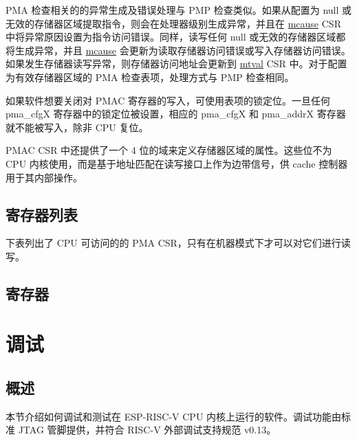 \documentclass[main\_\_CN.tex]{subfiles}
\begin{document}
PMA 检查相关的的异常生成及错误处理与 PMP 检查类似。如果从配置为 null 或无效的存储器区域提取指令，则会在处理器级别生成异常，并且在 \hyperref[regdesc:MCAUSE]{mcause} CSR 中将异常原因设置为指令访问错误。同样，读写任何 null 或无效的存储器区域都将生成异常，并且 \hyperref[regdesc:MCAUSE]{mcause} 会更新为读取存储器访问错误或写入存储器访问错误。如果发生存储器读写异常，则存储器访问地址会更新到 \hyperref[regdesc:MTVAL]{mtval} CSR 中。对于配置为有效存储器区域的 PMA 检查表项，处理方式与 PMP 检查相同。

如果软件想要关闭对 PMAC 寄存器的写入，可使用表项的锁定位。一旦任何 pma\_cfgX 寄存器中的锁定位被设置，相应的 pma\_cfgX 和 pma\_addrX 寄存器就不能被写入，除非 CPU 复位。

PMAC CSR 中还提供了一个 4 位的域来定义存储器区域的属性。这些位不为 CPU 内核使用，而是基于地址匹配在读写接口上作为边带信号，供 cache 控制器用于其内部操作。


\clearpage
\hypertarget{riscvcpu-pma-reg-summ}{}
\subsection{寄存器列表}
\label{sec:riscvcpu-pma-reg-summ}

下表列出了 CPU 可访问的的 PMA CSR，只有在机器模式下才可以对它们进行读写。




\subsection{寄存器}
\label{sec:riscvcpu-pma-reg-desc}





\clearpage
\section{调试}
\label{sec:riscvcpu-dbg}


\subsection{概述}
\label{sec:riscvcpu-dbg-overview}
本节介绍如何调试和测试在 ESP-RISC-V CPU 内核上运行的软件。调试功能由标准 JTAG 管脚提供，并符合 RISC-V 外部调试支持规范 v0.13。
\end{document}
